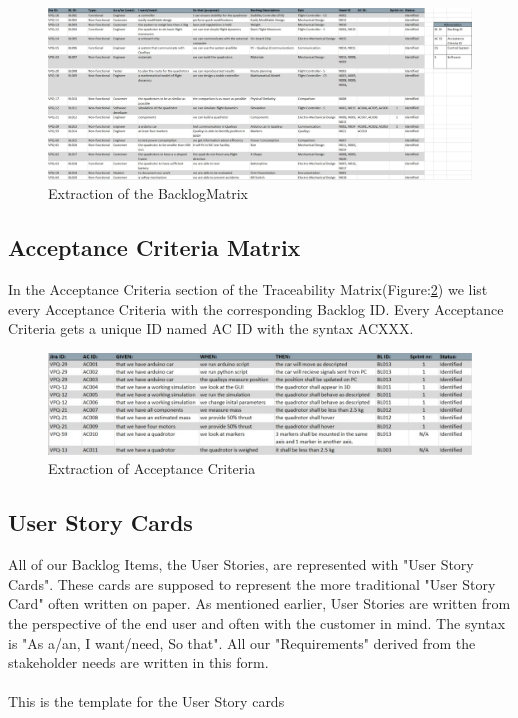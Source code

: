 \begin{figure}[h]
    \centering
        \includegraphics[width = 1\textwidth]{VAPIQ-PICTURES/BacklogMatrix}
    \caption{Extraction of the BacklogMatrix}
    \label{fig:backlog}
\end{figure}

\newpage

\subsection{Acceptance Criteria Matrix}
In the Acceptance Criteria section of the Traceability Matrix(Figure:\ref{fig:acm}) we list every Acceptance Criteria with the corresponding Backlog ID. Every Acceptance Criteria gets a unique ID named AC ID with the syntax ACXXX. 
\begin{figure}[h]
    \centering
        \includegraphics[width = 1\textwidth]{VAPIQ-PICTURES/AC}
    \caption{Extraction of Acceptance Criteria}
    \label{fig:acm}
\end{figure}

\newpage

\subsection{User Story Cards}
All of our Backlog Items, the User Stories, are represented with "User Story Cards". These cards are supposed to represent the more traditional "User Story Card" often written on paper. As mentioned earlier, User Stories are written from the perspective of the end user and often with the customer in mind. The syntax is "As a/an, I want/need, So that". All our "Requirements" derived from the stakeholder needs are written in this form. \\ 
\\
This is the template for the User Story cards 

